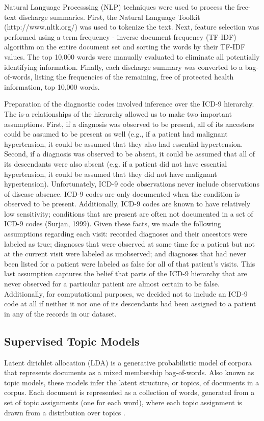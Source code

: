 \documentclass{article}
\begin{document}
Natural Language Processsing (NLP) techniques were used to process the free-text discharge summaries.  First, the Natural Language Toolkit (http://www.nltk.org/) was used to tokenize the text.  Next, feature selection was performed using a term frequency - inverse document frequency (TF-IDF) algorithm on the entire document set and sorting the words by their TF-IDF values.  The top 10,000 words were manually evaluated to eliminate all potentially identifying information.  Finally, each discharge summary was converted to a bag-of-words, listing the frequencies of the remaining, free of protected health information, top 10,000 words.

Preparation of the diagnostic codes involved inference over the ICD-9 hierarchy.  The is-a relationships of the hierarchy allowed us to make two important assumptions.  First, if a diagnosis was observed to be present, all of its ancestors could be assumed to be present as well (e.g., if a patient had malignant hypertension, it could be assumed that they also had essential hypertension.  Second, if a diagnosis was observed to be absent, it could be assumed that all of its descendants were also absent (e.g. if a patient did not have essential hypertension, it could be assumed that they did not have malignant hypertension).  Unfortunately, ICD-9 code observations never include observations of disease absence.  ICD-9 codes are only documented when the condition is observed to be present.  Additionally, ICD-9 codes are known to have relatively low sensitivity; conditions that are present are often not documented in a set of ICD-9 codes (Surjan, 1999). Given these facts, we made the following assumptions regarding each visit: recorded diagnoses and their ancestors were labeled as true; diagnoses that were observed at some time for a patient but not at the current visit were labeled as unobserved; and diagnoses that had never been listed for a patient were labeled as false for all of that patient’s visits. This last assumption captures the belief that parts of the ICD-9 hierarchy that are never observed for a particular patient are almost certain to be false.  Additionally, for computational purposes, we decided not to include an ICD-9 code at all if neither it nor one of its descendants had been assigned to a patient in any of the records in our dataset.

\subsection{Supervised Topic Models}
Latent dirichlet allocation (LDA) is a generative probabilistic model of corpora that represents documents as a mixed membership bag-of-words. Also known as topic models, these models infer the latent structure, or topics, of documents in a corpus. Each document is represented as a collection of words, generated from a set of topic assignments (one for each word), where each topic assignment is drawn from a distribution over topics \citep{Blei2003}.
\end{document}
